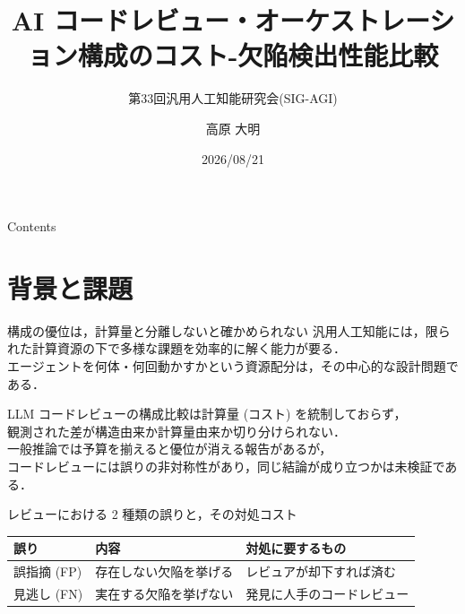\documentclass[10pt, aspectratio=169, t]{beamer}
\title{AI コードレビュー・オーケストレーション構成のコスト-欠陥検出性能比較}
\subtitle{第33回汎用人工知能研究会(SIG-AGI)}
\date{2026/08/21}
\author{高原 大明}
\institute{
北陸先端科学技術大学院大学\\
先端科学技術研究科 先端科学技術専攻\\
人間情報学研究領域\\
社会的信号処理・マルチモーダルインタラクション研究室}
\begin{document}
\maketitle

\begin{frame}{Contents}
    \tableofcontents[hideallsubsections]
\end{frame}

\section{背景と課題}

\begin{frame}{構成の優位は，計算量と分離しないと確かめられない}
    汎用人工知能には，\alert{限られた計算資源の下で多様な課題を効率的に解く}能力が要る．\\
    エージェントを何体・何回動かすかという資源配分は，その中心的な設計問題である．

    \vspace{6pt}
    LLM コードレビューの構成比較は\alert{計算量 (コスト) を統制しておらず}\cite{codeagent,guo2024largelanguagemodelbased}，\\
    観測された差が構造由来か計算量由来か切り分けられない．\\
    一般推論では予算を揃えると優位が消える報告があるが\cite{mad,reflexion,wang2024rethinkingboundsllmreasoning}，\\
    コードレビューには\alert{誤りの非対称性}があり，同じ結論が成り立つかは未検証である．

    \vspace{6pt}
    \begin{center}
        \small レビューにおける 2 種類の誤りと，その対処コスト\\[3pt]
        \footnotesize
        \begin{tabular}{@{}lll@{}}
            \toprule
            誤り & 内容 & 対処に要するもの \\
            \midrule
            誤指摘 (FP) & 存在しない欠陥を挙げる & レビュアが却下すれば済む \\
            見逃し (FN) & 実在する欠陥を挙げない & 発見に人手のコードレビュー \\
            \bottomrule
        \end{tabular}
    \end{center}
\end{frame}
\end{document}
